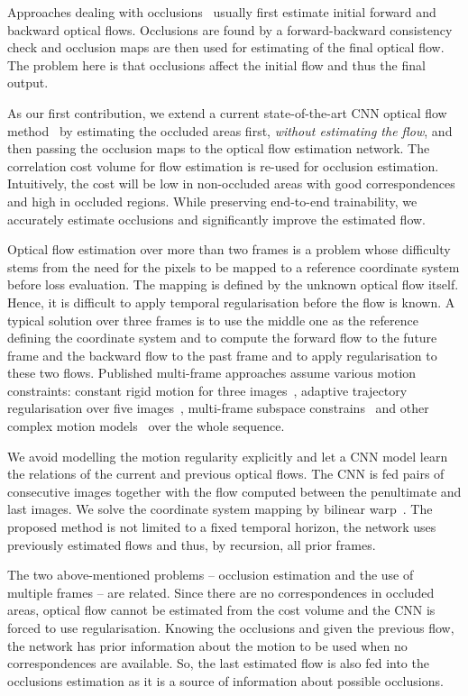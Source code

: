 \documentclass[runningheads]{llncs}
\begin{document}
Approaches dealing with occlusions~\cite{Meister2017,Bailer2015} usually first estimate initial forward and backward optical flows. 
Occlusions are found by a forward-backward consistency check and occlusion maps are then used for estimating of the final optical flow.
The problem here is that occlusions affect the initial flow and thus the final output.

As our first contribution, we extend a current state-of-the-art CNN optical flow method~\cite{Sun2017} by estimating the occluded areas first, {\it without estimating the flow}, and then passing the occlusion maps to the optical flow estimation network.
The correlation cost volume for flow estimation is re-used for occlusion estimation. Intuitively, the cost will be low in non-occluded areas with good correspondences and high in occluded regions.
While preserving end-to-end trainability, we accurately estimate occlusions and significantly improve the estimated flow.

Optical flow estimation over more than two frames is a problem  whose difficulty stems from the need for the pixels to be mapped to a reference coordinate system before loss evaluation.
The mapping is defined by the unknown optical flow itself.
Hence, it is difficult to apply temporal regularisation  before the flow is known.
A typical solution over three frames is to use the middle one as the reference  defining the coordinate system and to compute the forward flow to the future frame and the backward flow to the past frame and to apply regularisation to these two flows. 
Published multi-frame approaches assume various motion constraints: constant rigid motion for  three images~\cite{Wulff2017}, adaptive trajectory regularisation over five images~\cite{Volz2011}, multi-frame subspace constrains~\cite{Irani2002} and other complex motion models~\cite{Garg2013} over the whole sequence.

We avoid modelling the motion regularity explicitly and let a CNN model learn the relations of the current and previous optical flows.
The CNN is fed pairs of consecutive images together with the flow computed between the penultimate and last images.
We solve the coordinate system mapping by bilinear warp~\cite{Jaderberg2015}.
The proposed method is not limited to a fixed temporal horizon, the network uses previously estimated flows and thus, by recursion, all prior frames.


The two above-mentioned problems -- occlusion estimation and the use of multiple frames -- are related.
Since there are no correspondences in occluded areas, optical flow cannot be estimated from the cost volume and the CNN is forced to use regularisation.
Knowing the occlusions and given the previous flow, the network has prior information about the motion to be used when no correspondences are available.
So, the last estimated flow is also fed into the occlusions estimation as it is a source of information about possible occlusions.
\end{document}
